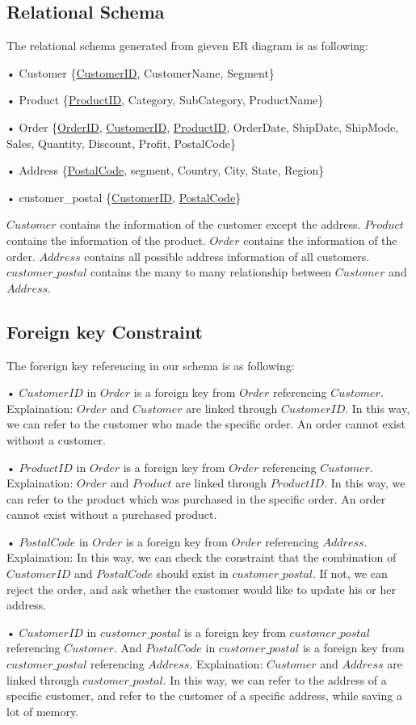 \subsection{Relational Schema}
\label{sect:sub-title}
The relational schema generated from gieven ER diagram is as following: \par
• Customer \{\underline{CustomerID}, CustomerName, Segment\} \par
• Product \{\underline{ProductID}, Category, SubCategory, ProductName\}  \par
• Order \{\underline{OrderID}, \underline{CustomerID}, \underline{ProductID}, OrderDate, ShipDate, ShipMode, Sales, Quantity, Discount, Profit, PostalCode\} \par
• Address \{\underline{PostalCode}, segment, Country, City, State, Region\} \par
• customer\_postal \{\underline{CustomerID}, \underline{PostalCode}\}\par
$Customer$ contains the information of the customer except the address. $Product$ contains the information of the product. $Order$ contains the information of the order. $Address$ contains all possible address information of all customers. $customer\_postal$ contains the many to many relationship between $Customer$ and $Address$.

\subsection{Foreign key Constraint}
\label{sect:sub-title}
The forerign key referencing in our schema is as following:\par
• $CustomerID$ in $Order$ is a foreign key from $Order$ referencing $Customer$. 
Explaination: $Order$ and $Customer$ are linked through $CustomerID$. In this way, we can refer to the customer who made the specific order. An order 
cannot exist without a customer. \par
• $ProductID$ in $Order$ is a foreign key from $Order$ referencing $Customer$. 
Explaination: $Order$ and $Product$ are linked through $ProductID$. In this way, we can refer to the product which was purchased in the specific order. An order cannot exist without a purchased product. \par
• $PostalCode$ in $Order$ is a foreign key from $Order$ referencing $Address$. 
Explaination: In this way, we can check the constraint that the combination of $CustomerID$ and $PostalCode$ should exist in $customer\_postal$. If not, we can reject the order, and ask whether the customer would like to update his or her address. \par
• $CustomerID$ in $customer\_postal$ is a foreign key from $customer\_postal$ referencing $Customer$. And $PostalCode$ in $customer\_postal$ is a foreign key from $customer\_postal$ referencing $Address$. 
Explaination: $Customer$ and $Address$ are linked through  $customer\_postal$. In this way, we can refer to the 
address of a specific customer, and refer to the customer of a specific address, while saving a lot of memory. \par

